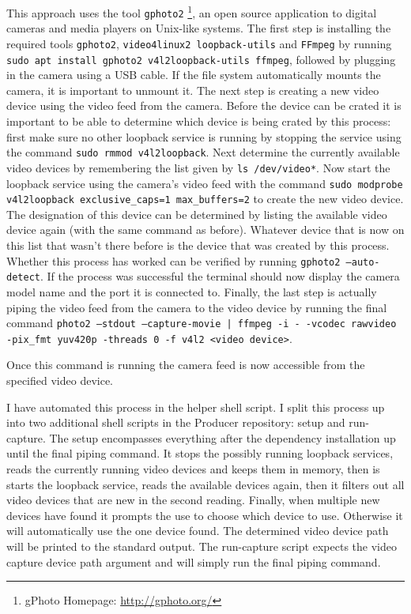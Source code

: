 This approach uses the tool \texttt{gphoto2} \footnote{gPhoto Homepage: \url{http://gphoto.org/}}, an open source application to digital cameras and media players on Unix-like systems. The first step is installing the required tools \texttt{gphoto2}, \texttt{video4linux2 loopback-utils} and \texttt{FFmpeg} by running \texttt{sudo apt install gphoto2 v4l2loopback-utils ffmpeg}, followed by plugging in the camera using a USB cable. If the file system automatically mounts the camera, it is important to unmount it.  The next step is creating a new video device using the video feed from the camera. Before the device can be crated it is important to be able to determine which device is being crated by this process: first make sure no other loopback service is running by stopping the service using the command \texttt{sudo rmmod v4l2loopback}. Next determine the currently available video devices by remembering the list given by \texttt{ls /dev/video*}. Now start the loopback service using the camera's video feed with the command \texttt{sudo modprobe v4l2loopback exclusive\_caps=1 max\_buffers=2} to create the new video device. The designation of this device can be determined by listing the available video device again (with the same command as before). Whatever device that is now on this list that wasn't there before is the device that was created by this process. Whether this process has worked can be verified by running \texttt{gphoto2 --auto-detect}. If the process was successful the terminal should now display the camera model name and the port it is connected to. Finally, the last step is actually piping the video feed from the camera to the video device by running the final command \texttt{photo2 --stdout --capture-movie | ffmpeg -i - -vcodec rawvideo -pix\_fmt yuv420p -threads 0 -f v4l2 <video device>}. 

Once this command is running the camera feed is now accessible from the specified video device.

I have automated this process in the helper shell script. I split this process up into two additional shell scripts in the Producer repository: setup and run-capture. The setup encompasses everything after the dependency installation up until the final piping command. It stops the possibly running loopback services, reads the currently running video devices and keeps them in memory, then is starts the loopback service, reads the available devices again, then it filters out all video devices that are new in the second reading. Finally, when multiple new devices have found it prompts the use to choose which device to use. Otherwise it will automatically use the one device found. The determined video device path will be printed to the standard output. The run-capture script expects the video capture device path argument and will simply run the final piping command.

